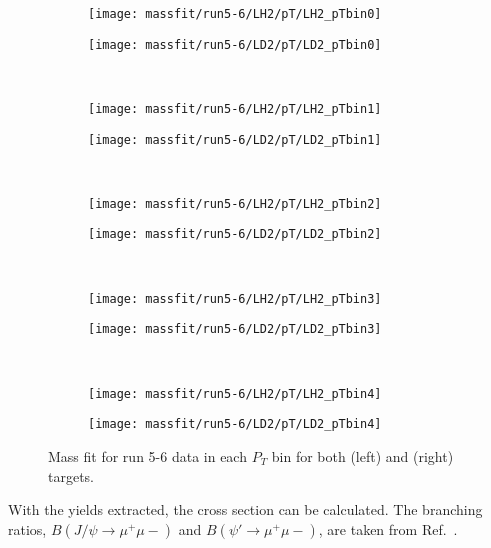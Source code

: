 \documentclass[../main.tex]{subfiles}
\begin{document}
\begin{figure}[h]
	\centering
	\begin{subfigure}{0.4\linewidth}
		\texttt{[image: massfit/run5-6/LH2/pT/LH2\_pTbin0]}
	\end{subfigure}
	\begin{subfigure}{0.4\linewidth}
		\texttt{[image: massfit/run5-6/LD2/pT/LD2\_pTbin0]}
	\end{subfigure}\\
	\begin{subfigure}{0.4\linewidth}
		\texttt{[image: massfit/run5-6/LH2/pT/LH2\_pTbin1]}
	\end{subfigure}
	\begin{subfigure}{0.4\linewidth}
		\texttt{[image: massfit/run5-6/LD2/pT/LD2\_pTbin1]}
	\end{subfigure}\\
	\begin{subfigure}{0.4\linewidth}
		\texttt{[image: massfit/run5-6/LH2/pT/LH2\_pTbin2]}
	\end{subfigure}
	\begin{subfigure}{0.4\linewidth}
		\texttt{[image: massfit/run5-6/LD2/pT/LD2\_pTbin2]}
	\end{subfigure}\\
	\begin{subfigure}{0.4\linewidth}
		\texttt{[image: massfit/run5-6/LH2/pT/LH2\_pTbin3]}
	\end{subfigure}
	\begin{subfigure}{0.4\linewidth}
		\texttt{[image: massfit/run5-6/LD2/pT/LD2\_pTbin3]}
	\end{subfigure}\\
	\begin{subfigure}{0.4\linewidth}
		\texttt{[image: massfit/run5-6/LH2/pT/LH2\_pTbin4]}
	\end{subfigure}
	\begin{subfigure}{0.4\linewidth}
		\texttt{[image: massfit/run5-6/LD2/pT/LD2\_pTbin4]}
	\end{subfigure}
	\caption{Mass fit for run 5-6 data in each $P_T$ bin for both (left) and (right) targets. }
	\label{fig:massfit_5-6_pT}
\end{figure}

With the yields extracted, the cross section can be calculated.
The branching ratios, $B\left(J/\psi\rightarrow\mu^+\mu-\right)$
and $B\left(\psi'\rightarrow\mu^+\mu-\right)$, are taken from Ref.~\cite{workman2022}.
\end{document}
